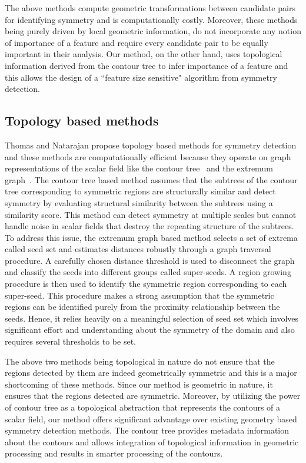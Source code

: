 \documentclass[review,journal]{vgtc}         %
\begin{document}
The above methods compute geometric transformations between candidate pairs for identifying
symmetry and is computationally costly. Moreover, these methods being purely driven by local geometric 
information, do not incorporate any notion of importance of a feature and require every candidate pair 
to be equally important in their analysis. Our method, on the other hand, uses topological
information derived from the contour tree to infer importance of a feature and this allows the
design of a ``feature size sensitive" algorithm from symmetry detection.
\subsection{Topology based methods}
Thomas and Natarajan propose topology based methods for symmetry detection and these methods 
are computationally efficient because they operate on graph representations of the scalar field
like the contour tree~\cite{} and the extremum graph~\cite{}. The contour tree based method 
assumes that the subtrees of the contour tree corresponding to symmetric regions are structurally
similar and detect symmetry by evaluating structural similarity between the subtrees using a 
similarity score. This method can detect symmetry at multiple scales but cannot handle
noise in scalar fields that destroy the repeating structure of the subtrees. To address
this issue, the extremum graph based method selects a set of extrema called seed set and 
estimates distances robustly through a graph traversal procedure. A carefully chosen distance 
threshold is used to disconnect the graph and classify the seeds into different groups called 
super-seeds. A region growing procedure is then used to identify the symmetric region 
corresponding to each super-seed. This procedure makes a strong assumption that the symmetric regions
can be identified purely from the proximity relationship between the seeds. Hence,
it relies heavily on a meaningful selection of seed set which involves significant effort 
and understanding about the symmetry of the domain and also requires several thresholds
to be set.

The above two methods being topological in nature do not ensure that the regions detected by
them are indeed geometrically symmetric and this is a major shortcoming of these methods.
Since our method is geometric in nature, it ensures that the regions detected are symmetric.
Moreover, by utilizing the power of contour tree as a topological abstraction that represents
the contours of a scalar field, our method offers significant advantage over existing geometry
based symmetry detection methods. The contour tree provides metadata information about the contours
and allows integration of topological information in geometric processing and results in smarter
processing of the contours.
\end{document}

